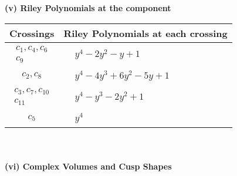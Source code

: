 \documentclass[1p]{elsarticle_modified}
\theoremstyle{definition}
\begin{document}
\newpage\renewcommand{\arraystretch}{1}
\flushleft \textbf{(v) Riley Polynomials at the component}\newline \\
\begin{tabular}{m{50pt}|m{274pt}}
Crossings & \hspace{64pt}Riley Polynomials at each crossing \\
\hline $$\begin{aligned}c_{1},c_{4},c_{6}\\c_{9}\end{aligned}$$&$\begin{aligned}
&y^4-2 y^2- y+1
\end{aligned}$\\
\hline $$\begin{aligned}c_{2},c_{8}\end{aligned}$$&$\begin{aligned}
&y^4-4 y^3+6 y^2-5 y+1
\end{aligned}$\\
\hline $$\begin{aligned}c_{3},c_{7},c_{10}\\c_{11}\end{aligned}$$&$\begin{aligned}
&y^4- y^3-2 y^2+1
\end{aligned}$\\
\hline $$\begin{aligned}c_{5}\end{aligned}$$&$\begin{aligned}
&y^4
\end{aligned}$\\
\hline
\end{tabular}\\~\\
\newpage\flushleft \textbf{(vi) Complex Volumes and Cusp Shapes}
\end{document}
